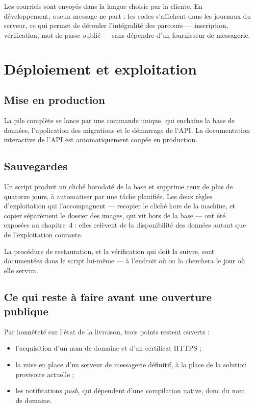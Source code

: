 
Les courriels sont envoyés dans la langue choisie par la cliente. En
développement, aucun message ne part : les codes s'affichent dans les journaux
du serveur, ce qui permet de dérouler l'intégralité des parcours --- inscription,
vérification, mot de passe oublié --- sans dépendre d'un fournisseur de
messagerie.

\section{Déploiement et exploitation}

\subsection{Mise en production}

La pile complète se lance par une commande unique, qui enchaîne la base de
données, l'application des migrations et le démarrage de l'API. La
documentation interactive de l'API est automatiquement coupée en production.

\subsection{Sauvegardes}

Un script produit un cliché horodaté de la base et supprime ceux de plus de
quatorze jours, à automatiser par une tâche planifiée. Les deux règles
d'exploitation qui l'accompagnent --- recopier le cliché hors de la machine, et
copier séparément le dossier des images, qui vit hors de la base --- ont été
exposées au chapitre~4 : elles relèvent de la disponibilité des données autant
que de l'exploitation courante.

La procédure de restauration, et la vérification qui doit la suivre, sont
documentées dans le script lui-même --- à l'endroit où on la cherchera le jour
où elle servira.

\subsection{Ce qui reste à faire avant une ouverture publique}

Par honnêteté sur l'état de la livraison, trois points restent ouverts :

\begin{itemize}[leftmargin=1.2cm]
  \item l'acquisition d'un nom de domaine et d'un certificat HTTPS ;
  \item la mise en place d'un serveur de messagerie définitif, à la place de la
  solution provisoire actuelle ;
  \item les notifications \textit{push}, qui dépendent d'une compilation
  native, donc du nom de domaine.
\end{itemize}

